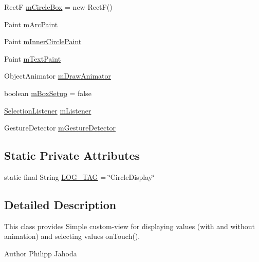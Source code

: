 \begin{DoxyCompactItemize}
Rect\-F \hyperlink{classcs_1_1nsense_1_1_circle_display_a567ff653ac64f18c2b932af4435751d1}{m\-Circle\-Box} = new Rect\-F()
\item 
Paint \hyperlink{classcs_1_1nsense_1_1_circle_display_add14b4dbd5523db5c3f567bfe6ab0e33}{m\-Arc\-Paint}
\item 
Paint \hyperlink{classcs_1_1nsense_1_1_circle_display_a4d2b08f5d5d7a65d6099a5b2e8368112}{m\-Inner\-Circle\-Paint}
\item 
Paint \hyperlink{classcs_1_1nsense_1_1_circle_display_ae5dd88ea958c6fe25ff333e3cd04b1f7}{m\-Text\-Paint}
\item 
Object\-Animator \hyperlink{classcs_1_1nsense_1_1_circle_display_af1ba69d043c26f35727b48ffec84bd40}{m\-Draw\-Animator}
\item 
boolean \hyperlink{classcs_1_1nsense_1_1_circle_display_a6c37ecdf3473018a470fa6f06d11d14a}{m\-Box\-Setup} = false
\item 
\hyperlink{interfacecs_1_1nsense_1_1_circle_display_1_1_selection_listener}{Selection\-Listener} \hyperlink{classcs_1_1nsense_1_1_circle_display_adae4901839766d131af8bf6f4dc85bd9}{m\-Listener}
\item 
Gesture\-Detector \hyperlink{classcs_1_1nsense_1_1_circle_display_a9adbd13c9a664ea39e216969aae56cca}{m\-Gesture\-Detector}
\end{DoxyCompactItemize}
\subsection*{Static Private Attributes}
\begin{DoxyCompactItemize}
\item 
static final String \hyperlink{classcs_1_1nsense_1_1_circle_display_aac227ce27ca731920766d70a5e0e1d08}{L\-O\-G\-\_\-\-T\-A\-G} = \char`\"{}Circle\-Display\char`\"{}
\end{DoxyCompactItemize}


\subsection{Detailed Description}
This class provides Simple custom-\/view for displaying values (with and without animation) and selecting values on\-Touch().

\begin{DoxyAuthor}{Author}
Philipp Jahoda 
\end{DoxyAuthor}


